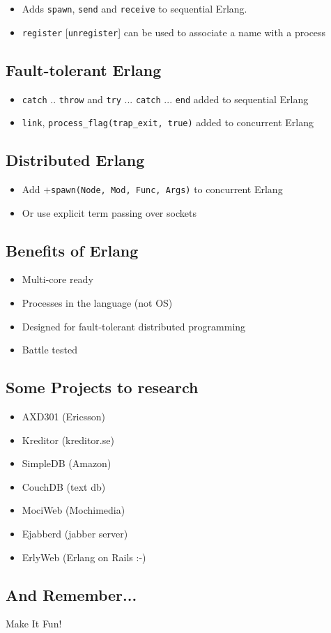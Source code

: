 \documentclass[12pt]{article}
\begin{document}
\begin{itemize}
\item Adds \verb+spawn+, \verb+send+ and \verb+receive+ to sequential Erlang.
\item \verb+register+ [\verb+unregister+] can be used to associate a name with a process
\end{itemize}

\subsection{Fault-tolerant Erlang}

\begin{itemize}
\item \verb+catch+ .. \verb+throw+ and \verb+try+ ... \verb+catch+ ... \verb+end+ added to sequential Erlang
\item \verb+link+, \verb+process_flag(trap_exit, true)+ added to concurrent Erlang
\end{itemize}

\subsection{Distributed Erlang}
\begin{itemize}
\item Add +\verb+spawn(Node, Mod, Func, Args)+ to concurrent Erlang
\item  Or use explicit term passing over sockets
\end{itemize}

\subsection{Benefits of Erlang}
\begin{itemize}
\item Multi-core ready
\item Processes in the language (not OS)
\item Designed for fault-tolerant distributed programming
\item Battle tested
\end{itemize}

\subsection{Some Projects to research}
\begin{itemize}
\item AXD301 (Ericsson)
\item Kreditor (kreditor.se)
\item SimpleDB (Amazon)
\item CouchDB (text db)
\item MociWeb (Mochimedia)
\item Ejabberd (jabber server)
\item ErlyWeb (Erlang on Rails :-)
\end{itemize}

\subsection{And Remember...}

Make It Fun!
\end{document}
